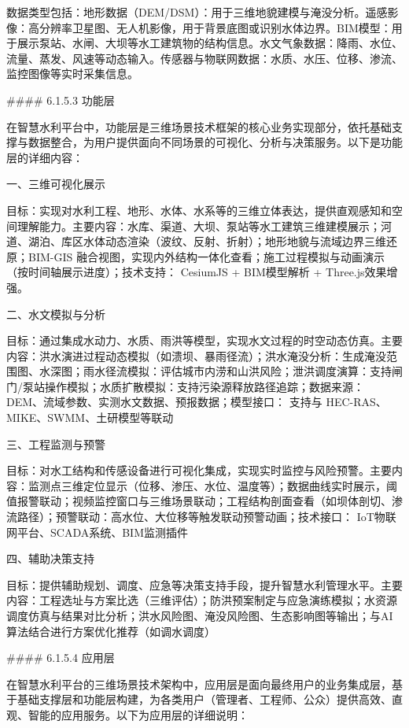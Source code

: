 数据类型包括：地形数据（DEM/DSM）：用于三维地貌建模与淹没分析。遥感影像：高分辨率卫星图、无人机影像，用于背景底图或识别水体边界。BIM模型：用于展示泵站、水闸、大坝等水工建筑物的结构信息。水文气象数据：降雨、水位、流量、蒸发、风速等动态输入。传感器与物联网数据：水质、水压、位移、渗流、监控图像等实时采集信息。

\#\#\#\# 6.1.5.3 功能层

在智慧水利平台中，功能层是三维场景技术框架的核心业务实现部分，依托基础支撑与数据整合，为用户提供面向不同场景的可视化、分析与决策服务。以下是功能层的详细内容：

一、三维可视化展示

目标：实现对水利工程、地形、水体、水系等的三维立体表达，提供直观感知和空间理解能力。主要内容：水库、渠道、大坝、泵站等水工建筑三维建模展示；河道、湖泊、库区水体动态渲染（波纹、反射、折射）；地形地貌与流域边界三维还原；BIM-GIS 融合视图，实现内外结构一体化查看；施工过程模拟与动画演示（按时间轴展示进度）；技术支持： CesiumJS + BIM模型解析 + Three.js效果增强。

二、水文模拟与分析

目标：通过集成水动力、水质、雨洪等模型，实现水文过程的时空动态仿真。主要内容：洪水演进过程动态模拟（如溃坝、暴雨径流）；洪水淹没分析：生成淹没范围图、水深图；雨水径流模拟：评估城市内涝和山洪风险；泄洪调度演算：支持闸门/泵站操作模拟；水质扩散模拟：支持污染源释放路径追踪；数据来源： DEM、流域参数、实测水文数据、预报数据；模型接口： 支持与 HEC-RAS、MIKE、SWMM、土研模型等联动

三、工程监测与预警

目标：对水工结构和传感设备进行可视化集成，实现实时监控与风险预警。主要内容：监测点三维定位显示（位移、渗压、水位、温度等）；数据曲线实时展示，阈值报警联动；视频监控窗口与三维场景联动；工程结构剖面查看（如坝体剖切、渗流路径）；预警联动：高水位、大位移等触发联动预警动画；技术接口： IoT物联网平台、SCADA系统、BIM监测插件

四、辅助决策支持

目标：提供辅助规划、调度、应急等决策支持手段，提升智慧水利管理水平。主要内容：工程选址与方案比选（三维评估）；防洪预案制定与应急演练模拟；水资源调度仿真与结果对比分析；洪水风险图、淹没风险图、生态影响图等输出；与AI算法结合进行方案优化推荐（如调水调度）

\#\#\#\# 6.1.5.4 应用层

在智慧水利平台的三维场景技术架构中，应用层是面向最终用户的业务集成层，基于基础支撑层和功能层构建，为各类用户（管理者、工程师、公众）提供高效、直观、智能的应用服务。以下为应用层的详细说明：

